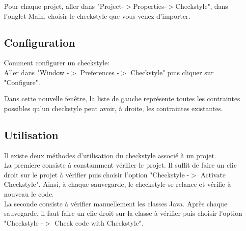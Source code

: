 \documentclass{article}
\begin{document}
Pour chaque projet, aller dans "Project-$>$Properties-$>$Checkstyle", 
dans l'onglet Main, choisir le checkstyle que vous venez d'importer.


\subsection{Configuration}

Comment configurer un checkstyle:\\

Aller dans "Window -$>$ Preferences -$>$ Checkstyle" 
puis cliquer sur "Configure".

Dans cette nouvelle fen\^etre, la liste de gauche repr\'esente toutes les contraintes 
possibles qu'un checkstyle peut avoir, \`a droite, les contraintes existantes.

\subsection{Utilisation}

Il existe deux m\'ethodes d'utilisation du checkstyle associ\'e \`a un projet.\\

La premiere consiste \`a constamment v\'erifier le projet.
Il suffit de faire un clic droit sur le projet \`a v\'erifier 
puis choisir l'option "Checkstyle -$>$ Activate Checkstyle".
Ainsi, \`a chaque sauvegarde, le checkstyle se relance et v\'erifie \`a nouveau le code.\\

La seconde consiste \`a v\'erifier manuellement les classes Java.
Apr\`es chaque sauvegarde, il faut faire un clic droit sur la classe \`a v\'erifier 
puis choisir l'option "Checkstyle -$>$ Check code with Checkstyle".
\end{document}
